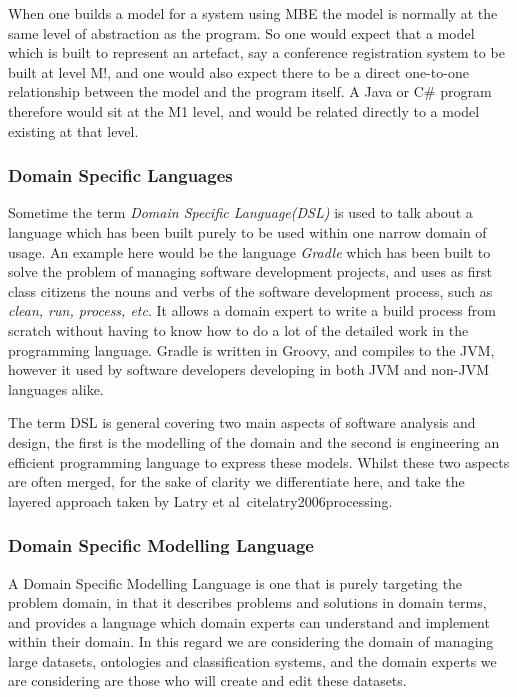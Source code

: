 \documentclass{llncs}
\begin{document}
When one builds a model for a system using MBE the model is normally at the same level of abstraction as the program.  So one would expect that a model which is built to represent an artefact, say a conference registration system to be built at level M!, and one would also expect there to be a direct one-to-one relationship between the model and the program itself. A Java or C\# program therefore would sit at the M1 level, and would be related directly to a model existing at that level.

\subsubsection{Domain Specific Languages}
Sometime the term \emph{Domain Specific Language(DSL)} is used to talk about a language which has been built purely to be used within one narrow domain of usage. An example here would be the language \emph{Gradle} which has been built to solve the problem of managing software development projects, and uses as first class citizens the nouns and verbs of the software development process, such as \emph{clean, run, process, etc}. It allows a domain expert to write a build process from scratch without having to know how to do a lot of the detailed work in the programming language. Gradle is written in Groovy, and compiles to the JVM, however it used by software developers developing in both JVM and non-JVM languages alike.

The term DSL is general covering two main aspects of software analysis and design, the first is the modelling of the domain and the second is engineering an efficient programming language to express these models. Whilst these two aspects are often merged, for the sake of clarity we differentiate here, and take the layered approach taken by Latry et al~cite{latry2006processing}.
 

\subsubsection{Domain Specific Modelling Language}

A Domain Specific Modelling Language is one that is purely targeting the problem domain, in that it describes problems and solutions in domain terms, and provides a language which domain experts can understand and implement within their domain. In this regard we are considering the domain of managing large datasets, ontologies and classification systems, and the domain experts we are considering are those who will create and edit these datasets. 
\end{document}
